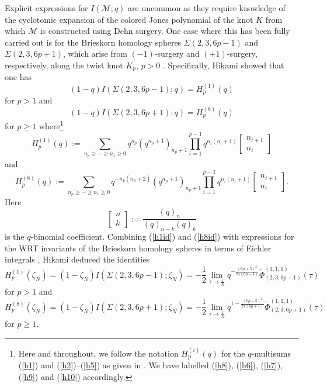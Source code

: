 \documentclass[11pt,reqno]{amsart}
\theoremstyle{definition}
\numberwithin{equation}{section}
\renewcommand{\=}{\;=\;}
\begin{document}
Explicit expressions for $I(\mathcal{M};q)$ are uncommon as they require knowledge of the cyclotomic expansion of the colored Jones polynomial of the knot $K$ from which $\mathcal{M}$ is constructed using Dehn surgery.  One case where this has been fully carried out is for the Brieskorn homology spheres $\Sigma(2,3, 6p-1)$ and $\Sigma(2,3,6p+1)$, which arise from $(-1)$-surgery and $(+1)$-surgery, respectively, along the twist knot $K_p$, $p>0$ \cite[Theorem C.1]{hikami5}.  Specifically, Hikami \cite{hikami5} showed that one has
\begin{equation} \label{h1id}
(1-q) I(\Sigma(2,3,6p-1);q) = H_p^{(1)}(q) 
\end{equation}
for $p>1$ and 
\begin{equation} \label{h8id}
(1-q) I(\Sigma(2,3,6p+1);q) = H_p^{(8)}(q)
\end{equation} 
for $p \geq 1$ where\footnote{Here and throughout, we follow the notation $H_p^{(i)}(q)$ for the $q$-multisums (\ref{h1}) and (\ref{h2})--(\ref{h5}) as given in \cite{tm}. We have labelled (\ref{h8}), (\ref{h6}), (\ref{h7}), (\ref{h9}) and (\ref{h10}) accordingly.} 
\begin{equation} \label{h1}
	H_p^{(1)}(q) := \sum_{n_p \geq \cdots \geq n_1 \geq 0} q^{n_p} (q^{n_p + 1})_{n_p + 1} \prod_{i=1}^{p-1} q^{n_i (n_i + 1)} \begin{bmatrix}
		n_{i+1} \\ n_i \end{bmatrix}
\end{equation}
and 
\begin{equation} \label{h8}
	H_p^{(8)}(q) := \sum_{n_p \geq \cdots \geq n_1 \geq 0} q^{-n_p(n_p+2)} (q^{n_p + 1})_{n_p + 1} \prod_{i=1}^{p-1} q^{n_i (n_i + 1)} \begin{bmatrix}
		n_{i+1} \\ n_i \end{bmatrix}.
\end{equation}
Here
\begin{equation} \label{qbc}
	\begin{bmatrix} n \\ k \end{bmatrix} := \frac{(q)_n}{(q)_{n-k} (q)_k}
\end{equation}
is the $q$-binomial coefficient.   Combining (\ref{h1id}) and (\ref{h8id}) with expressions for the WRT invariants of the Brieskorn homology spheres in terms of Eichler integrals \cite{hikami1}, Hikami deduced the identities \cite[Theorem 3.3]{hikami5}
\begin{equation} \label{h1p}
H_p^{(1)}(\zeta_N) = (1-\zeta_N) I(\Sigma(2,3, 6p-1); \zeta_N) =  -\frac{1}{2} \lim_{\tau \to \frac{1}{N}} q^{-\frac{(6p+5)^2}{24(6p-1)}} \widetilde{\Phi}_{(2,3,6p-1)}^{(1,1,1)} (\tau)
\end{equation}
for $p > 1$ and \cite[Theorem 2.4 and Proposition 3.2]{hikami5}
\begin{equation} \label{h8p}
H_p^{(8)}(\zeta_N) = (1-\zeta_N) I(\Sigma(2,3, 6p+1); \zeta_N) = -\frac{1}{2}  \lim_{\tau \to \frac{1}{N}} q^{1 - \frac{(6p-5)^2}{24(6p+1)}} \widetilde{\Phi}_{(2,3,6p+1)}^{(1,1,1)} (\tau)
\end{equation}
for $p \geq 1$.
\end{document}
